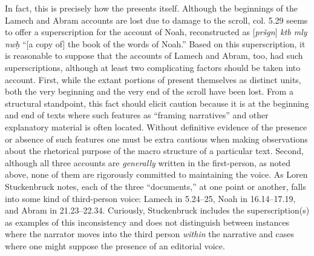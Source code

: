 In fact, this is precisely how the \ga presents itself. Although the beginnings of the Lamech and Abram accounts are lost due to damage to the scroll, col. 5.29 seems to offer a superscription for the account of Noah, reconstructed as [\emph{pršgn}] \emph{ktb mly nwḥ} ``[a copy of] the book of the words of Noah.'' Based on this superscription, it is reasonable to suppose that the accounts of Lamech and Abram, too, had such superscriptions, although at least two complicating factors should be taken into account. First, while the extant portions of \ga present themselves as distinct units, both the very beginning and the very end of the scroll have been lost. From a structural standpoint, this fact should elicit caution because it is at the beginning and end of texts where such features as ``framing narratives'' and other explanatory material is often located. Without definitive evidence of the presence or absence of such features one must be extra cautious when making observations about the rhetorical purpose of the macro structure of a particular text. Second, although all three accounts are \emph{generally} written in the first-person, as noted above, none of them are rigorously committed to maintaining the voice. As Loren Stuckenbruck notes, each of the three ``documents,'' at one point or another, falls into some kind of third-person voice: Lamech in 5.24--25, Noah in 16.14--17.19, and Abram in 21.23--22.34. Curiously, Stuckenbruck includes the superscription(s) as examples of this inconsistency and does not distinguish between instances where the narrator moves into the third person \emph{within} the narrative and cases where one might suppose the presence of an editorial voice.

